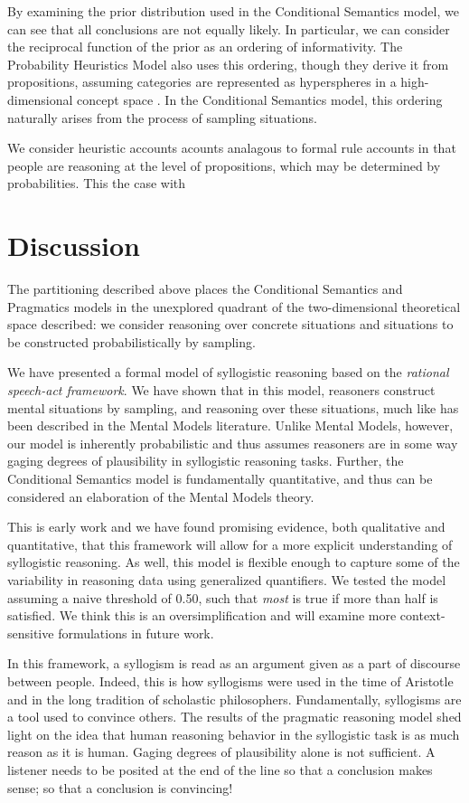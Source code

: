 \documentclass[10pt,letterpaper]{article}
\begin{document}
By examining the prior distribution used in the Conditional Semantics model, we can see that all conclusions are not equally likely. In particular, we can consider the reciprocal function of the prior as an ordering of informativity. The Probability Heuristics Model also uses this ordering, though they derive it from propositions, assuming categories are represented as hyperspheres in a high-dimensional concept space \cite{Chater1999}. In the Conditional Semantics model, this ordering naturally arises from the process of sampling situations.

We consider heuristic accounts acounts analagous to formal rule accounts in that people are reasoning at the level of propositions, which may be determined by probabilities. This the case with

\section{Discussion}

The partitioning described above places the Conditional Semantics and Pragmatics models in the unexplored quadrant of the two-dimensional theoretical space described: we consider reasoning over concrete situations and situations to be constructed probabilistically by sampling.

We have presented a formal model of syllogistic reasoning based on the \emph{rational speech-act framework}. We have shown that in this model, reasoners construct mental situations by sampling, and reasoning over these situations, much like has been described in the Mental Models literature. Unlike Mental Models, however, our model is inherently probabilistic and thus assumes reasoners are in some way gaging degrees of plausibility in syllogistic reasoning tasks. Further, the Conditional Semantics model is fundamentally quantitative, and thus can be considered an elaboration of the Mental Models theory.

This is early work and we have found promising evidence, both qualitative and quantitative, that this framework will allow for a more explicit understanding of syllogistic reasoning. As well, this model is flexible enough to capture some of the variability in reasoning data using generalized quantifiers. We tested the model assuming a naive threshold of 0.50, such that \emph{most} is true if more than half is satisfied. We think this is an oversimplification and will examine more context-sensitive formulations in future work.

In this framework, a syllogism is read as an argument given as a part of discourse between people. Indeed, this is how syllogisms were used in the time of Aristotle and in the long tradition of scholastic philosophers. Fundamentally, syllogisms are a tool used to convince others. The results of the pragmatic reasoning model shed light on the idea that human reasoning behavior in the syllogistic task is as much reason as it is human. Gaging degrees of plausibility alone is not sufficient. A listener needs to be posited at the end of the line so that a conclusion makes sense; so that a conclusion is convincing!
\end{document}

